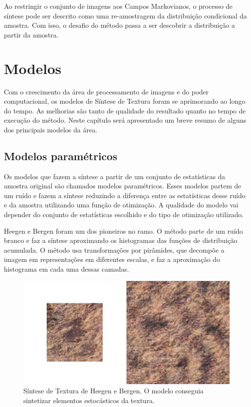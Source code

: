 
Ao restringir o conjunto de imagens aos
Campos Markovianos, o processo de síntese
pode ser descrito como uma re-amostragem
da distribuição condicional da amostra.
Com isso, o desafio do método passa a ser 
descobrir a distribuição a partir
da amostra.


\chapter{Modelos}

Com o crescimento da área de processamento
de imagens e do poder computacional,
os modelos de Síntese de Textura foram
se aprimorando ao longo do tempo.
As melhorias são tanto de qualidade
do resultado quanto no tempo de 
execução do método. Neste capítulo
será apresentado um breve resumo de
alguns dos principais modelos
da área.



\section{Modelos paramétricos}

Os modelos que fazem a síntese a partir
de um conjunto de estatísticas da amostra
original são chamados modelos paramétricos.
Esses modelos partem de um ruído e fazem
a síntese reduzindo
a diferença entre as estatísticas desse
ruído e da amostra utilizando uma função de 
otimização.
A qualidade do modelo vai depender do
conjunto de estatísticas escolhido
e do tipo de otimização utilizado.


Heegen e Bergen \cite{Heeger1995} foram
um dos pioneiros no ramo. O método
parte de um ruído branco e faz a síntese
aproximando os histogramas das funções
de distribuição acumulada.
O método usa transformações
por pirâmides, que decompõe a imagem
em representações em diferentes escalas,
e faz a aproximação do histograma
em cada uma dessas camadas.

\begin{figure}[!ht]
	\centering
	\includegraphics[width=\linewidth*2/3]{files/assets/articles/bergen.png}
	\caption{Síntese de Textura de Heegen e Bergen. O modelo
	conseguia sintetizar elementos estocásticos da textura.}
	\label{img:preview}
\end{figure}

